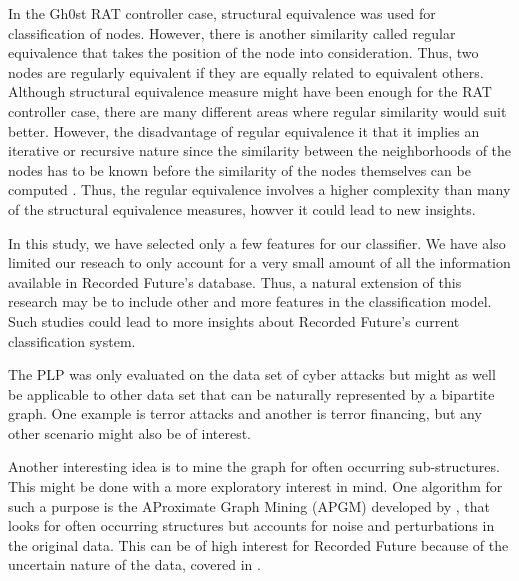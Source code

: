 In the Gh0st RAT controller case, structural equivalence was used for classification of nodes. However, there is another similarity called regular equivalence that takes the position of the node into consideration. Thus, two nodes are regularly equivalent if they are equally related to equivalent others. Although structural equivalence measure might have been enough for the RAT controller case, there are many different areas where regular similarity would suit better. However, the disadvantage of regular equivalence it that it implies an iterative or recursive nature since the similarity between the neighborhoods of the nodes has to be known before the similarity of the nodes themselves can be computed \cite{leicht2006}. Thus, the regular equivalence involves a higher complexity than many of the structural equivalence measures, howver it could lead to new insights. 

In this study, we have selected only a few features for our classifier. We have also limited our reseach to only account for a very small amount of all the information available in Recorded Future's database. Thus, a natural extension of this research may be to include other and more features in the classification model. Such studies could lead to more insights about Recorded Future's current classification system.

The PLP was only evaluated on the data set of cyber attacks but might as well be applicable to other data set that can be naturally represented by a bipartite graph. One example is terror attacks and another is terror financing, but any other scenario might also be of interest.

Another interesting idea is to mine the graph for often occurring sub-structures. This might be done with a more exploratory interest in mind. One algorithm for such a purpose is the AProximate Graph Mining (APGM) developed by \citet{Jia2011}, that looks for often occurring structures but accounts for noise and perturbations in the original data. This can be of high interest for Recorded Future because of the uncertain nature of the data, covered in .
